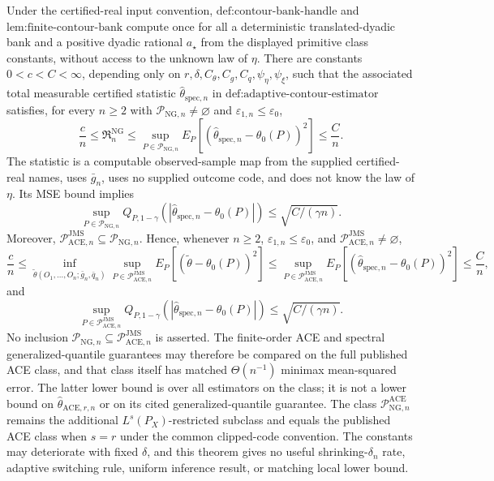 Under the certified-real input convention, \(\text{def:contour-bank-handle}\) and \(\text{lem:finite-contour-bank}\) compute once for all a deterministic translated-dyadic bank and a positive dyadic rational \(a_{\star}\) from the displayed primitive class constants, without access to the unknown law of \(\eta\). There are constants \(0<c<C<\infty\), depending only on \(r,\delta,C_{\theta},C_g,C_q,\psi_{\eta},\psi_{\xi}\), such that the associated total measurable certified statistic \(\widehat\theta_{\mathrm{spec},n}\) in \(\text{def:adaptive-contour-estimator}\) satisfies, for every \(n\ge2\) with \(\mathcal P_{\mathrm{NG},n}\neq\varnothing\) and \(\varepsilon_{1,n}\le\varepsilon_0\),
\[
 \frac cn\le\mathfrak R_n^{\mathrm{NG}}
 \le\sup_{P\in\mathcal P_{\mathrm{NG},n}}
 E_P[(\widehat\theta_{\mathrm{spec},n}-\theta_0(P))^2]
 \le\frac Cn.
\]
The statistic is a computable observed-sample map from the supplied certified-real names, uses \(\bar g_n\), uses no supplied outcome code, and does not know the law of \(\eta\). Its MSE bound implies
\[
 \sup_{P\in\mathcal P_{\mathrm{NG},n}}
 Q_{P,1-\gamma}(|\widehat\theta_{\mathrm{spec},n}-\theta_0(P)|)
 \le\sqrt{C/(\gamma n)}.
\]
Moreover, \(\mathcal P_{\mathrm{ACE},n}^{\mathrm{JMS}}\subseteq\mathcal P_{\mathrm{NG},n}\). Hence, whenever \(n\ge2\), \(\varepsilon_{1,n}\le\varepsilon_0\), and \(\mathcal P_{\mathrm{ACE},n}^{\mathrm{JMS}}\neq\varnothing\),
\[
 \frac cn
 \le
 \inf_{\widetilde\theta(O_1,\ldots,O_n;\bar g_n,\bar q_n)}
 \sup_{P\in\mathcal P_{\mathrm{ACE},n}^{\mathrm{JMS}}}
 E_P[(\widetilde\theta-\theta_0(P))^2]
 \le
 \sup_{P\in\mathcal P_{\mathrm{ACE},n}^{\mathrm{JMS}}}
 E_P[(\widehat\theta_{\mathrm{spec},n}-\theta_0(P))^2]
 \le\frac Cn,
\]
and
\[
 \sup_{P\in\mathcal P_{\mathrm{ACE},n}^{\mathrm{JMS}}}
 Q_{P,1-\gamma}(|\widehat\theta_{\mathrm{spec},n}-\theta_0(P)|)
 \le\sqrt{C/(\gamma n)}.
\]
No inclusion \(\mathcal P_{\mathrm{NG},n}\subseteq\mathcal P_{\mathrm{ACE},n}^{\mathrm{JMS}}\) is asserted. The finite-order ACE and spectral generalized-quantile guarantees may therefore be compared on the full published ACE class, and that class itself has matched \(\Theta(n^{-1})\) minimax mean-squared error. The latter lower bound is over all estimators on the class; it is not a lower bound on \(\widehat\theta_{\mathrm{ACE},r,n}\) or on its cited generalized-quantile guarantee. The class \(\mathcal P_{\mathrm{NG},n}^{\mathrm{ACE}}\) remains the additional \(L^s(P_X)\)-restricted subclass and equals the published ACE class when \(s=r\) under the common clipped-code convention. The constants may deteriorate with fixed \(\delta\), and this theorem gives no useful shrinking-\(\delta_n\) rate, adaptive switching rule, uniform inference result, or matching local lower bound.